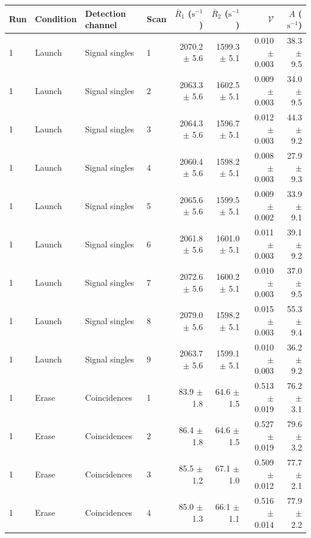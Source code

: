 \begin{tabular}{llllrrrr}
\toprule
Run & Condition & Detection channel & Scan & $\bar R_1$ ($\mathrm{s}^{-1}$) & $\bar R_2$ ($\mathrm{s}^{-1}$) & $\mathcal{V}$ & $A$ ($\mathrm{s}^{-1}$) \\
\midrule
1 & Launch & Signal singles & 1 & 2070.2 \ensuremath{\pm} 5.6 & 1599.3 \ensuremath{\pm} 5.1 & 0.010 \ensuremath{\pm} 0.003 & 38.3 \ensuremath{\pm} 9.5 \\
1 & Launch & Signal singles & 2 & 2063.3 \ensuremath{\pm} 5.6 & 1602.5 \ensuremath{\pm} 5.1 & 0.009 \ensuremath{\pm} 0.003 & 34.0 \ensuremath{\pm} 9.5 \\
1 & Launch & Signal singles & 3 & 2064.3 \ensuremath{\pm} 5.6 & 1596.7 \ensuremath{\pm} 5.1 & 0.012 \ensuremath{\pm} 0.003 & 44.3 \ensuremath{\pm} 9.2 \\
1 & Launch & Signal singles & 4 & 2060.4 \ensuremath{\pm} 5.6 & 1598.2 \ensuremath{\pm} 5.1 & 0.008 \ensuremath{\pm} 0.003 & 27.9 \ensuremath{\pm} 9.3 \\
1 & Launch & Signal singles & 5 & 2065.6 \ensuremath{\pm} 5.6 & 1599.5 \ensuremath{\pm} 5.1 & 0.009 \ensuremath{\pm} 0.002 & 33.9 \ensuremath{\pm} 9.1 \\
1 & Launch & Signal singles & 6 & 2061.8 \ensuremath{\pm} 5.6 & 1601.0 \ensuremath{\pm} 5.1 & 0.011 \ensuremath{\pm} 0.003 & 39.1 \ensuremath{\pm} 9.2 \\
1 & Launch & Signal singles & 7 & 2072.6 \ensuremath{\pm} 5.6 & 1600.2 \ensuremath{\pm} 5.1 & 0.010 \ensuremath{\pm} 0.003 & 37.0 \ensuremath{\pm} 9.5 \\
1 & Launch & Signal singles & 8 & 2079.0 \ensuremath{\pm} 5.6 & 1598.2 \ensuremath{\pm} 5.1 & 0.015 \ensuremath{\pm} 0.003 & 55.3 \ensuremath{\pm} 9.4 \\
1 & Launch & Signal singles & 9 & 2063.7 \ensuremath{\pm} 5.6 & 1599.1 \ensuremath{\pm} 5.1 & 0.010 \ensuremath{\pm} 0.003 & 36.2 \ensuremath{\pm} 9.2 \\
\midrule
1 & Erase & Coincidences & 1 & 83.9 \ensuremath{\pm} 1.8 & 64.6 \ensuremath{\pm} 1.5 & 0.513 \ensuremath{\pm} 0.019 & 76.2 \ensuremath{\pm} 3.1 \\
1 & Erase & Coincidences & 2 & 86.4 \ensuremath{\pm} 1.8 & 64.6 \ensuremath{\pm} 1.5 & 0.527 \ensuremath{\pm} 0.019 & 79.6 \ensuremath{\pm} 3.2 \\
1 & Erase & Coincidences & 3 & 85.5 \ensuremath{\pm} 1.2 & 67.1 \ensuremath{\pm} 1.0 & 0.509 \ensuremath{\pm} 0.012 & 77.7 \ensuremath{\pm} 2.1 \\
1 & Erase & Coincidences & 4 & 85.0 \ensuremath{\pm} 1.3 & 66.1 \ensuremath{\pm} 1.1 & 0.516 \ensuremath{\pm} 0.014 & 77.9 \ensuremath{\pm} 2.2 \\

\end{tabular}
